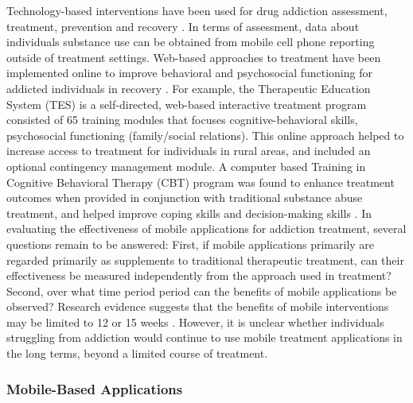 \documentclass[sigconf]{acmart}
\begin{document}
Technology-based interventions have been used for drug addiction assessment, 
treatment, prevention and recovery \cite{marsch12}. In terms of assessment, data 
about individuals substance use can be obtained from mobile cell phone reporting 
outside of treatment settings. Web-based approaches to treatment have been 
implemented online to improve behavioral and psychosocial functioning for addicted 
individuals in recovery \cite{marschdallery2012}. For example, the Therapeutic 
Education System (TES) is a self-directed, web-based interactive treatment program 
consisted of 65 training modules that  focuses cognitive-behavioral skills, 
psychosocial functioning (family/social relations). This online approach helped 
to increase access to treatment for individuals in rural areas, and included an 
optional contingency management module. A computer based Training in Cognitive 
Behavioral Therapy (CBT) program was found to enhance treatment outcomes when 
provided in conjunction with traditional substance abuse treatment, and helped 
improve coping skills and decision-making skills \cite{carroll08}. In evaluating 
the effectiveness of mobile applications for addiction treatment, several  
questions remain to be answered: First, if mobile applications primarily are
regarded primarily as supplements to traditional therapeutic treatment, can their 
effectiveness be measured independently from the approach used in treatment? 
Second, over what time period period can the benefits of mobile applications be 
observed? Research evidence suggests that the benefits of mobile interventions 
may be limited to 12 or 15 weeks \cite{swedenson16}. However, it is unclear 
whether individuals struggling from addiction would continue to use mobile 
treatment applications in the long terms, beyond a limited course of treatment.


\subsubsection{Mobile-Based Applications}
\end{document}
